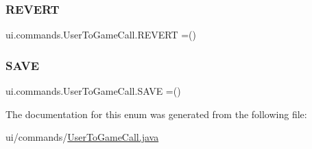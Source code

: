 \subsubsection{\texorpdfstring{R\+E\+V\+E\+RT}{REVERT}}
{\footnotesize\ttfamily ui.\+commands.\+User\+To\+Game\+Call.\+R\+E\+V\+E\+RT =()}

\mbox{\label{enumui_1_1commands_1_1_user_to_game_call_af61f53990b16b5cfbd61a8aed699c846}} 
\subsubsection{\texorpdfstring{S\+A\+VE}{SAVE}}
{\footnotesize\ttfamily ui.\+commands.\+User\+To\+Game\+Call.\+S\+A\+VE =()}



The documentation for this enum was generated from the following file\+:\begin{DoxyCompactItemize}
\item 
ui/commands/\mbox{\hyperlink{_user_to_game_call_8java}{User\+To\+Game\+Call.\+java}}\end{DoxyCompactItemize}

